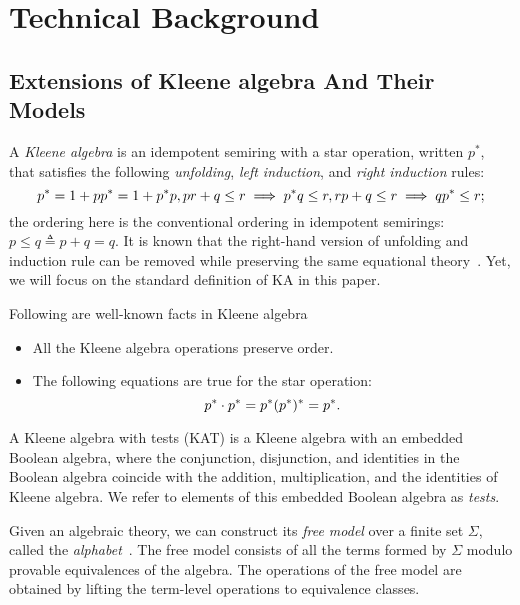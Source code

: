 \section{Technical Background}

\subsection{Extensions of Kleene algebra And Their Models}

A \emph{Kleene algebra} is an idempotent semiring with a star operation, written
$p^*$, that satisfies the following \emph{unfolding}, \emph{left induction},
and \emph{right induction} rules:
\[
    p^* = 1 + p p^* = 1 + p^* p, \\
    p r + q  \leq  r  \implies  p^* q  \leq  r, \\
    r p + q  \leq  r  \implies  q p^*  \leq  r;
\]
the ordering here is the conventional ordering in idempotent semirings: \(p  \leq  q  \triangleq  p + q = q.\)
It is known that the right-hand version of unfolding and induction rule 
can be removed while preserving the same equational theory~\cite{Kozen_Silva_2020}.
Yet, we will focus on the standard definition of KA in this paper.
\begin{lemma}\label{the: well known fact about KA}
    Following are well-known facts in Kleene algebra
    \begin{itemize}
        \item All the Kleene algebra operations preserve order.
        \item The following equations are true for the star operation:
              \[ p^*  \cdot  p^* = p^* \\ (p^*)^* = p^*.\]
    \end{itemize}
\end{lemma}

A Kleene algebra with tests (KAT) is a Kleene algebra with an embedded Boolean algebra,
where the conjunction, disjunction, and identities in the Boolean algebra coincide with 
the addition, multiplication, and the identities of Kleene algebra.  
We refer to elements of this embedded Boolean algebra as \emph{tests}.

Given an algebraic theory, we can construct its \emph{free model} 
over a finite set \( \Sigma \), 
called the \emph{alphabet}~\cite{burrisCourseUniversalAlgebra1981}.  
The free model consists of all the terms formed by \( \Sigma \) modulo 
provable equivalences of the algebra. The operations of the free model are obtained 
by lifting the term-level operations to equivalence classes.

